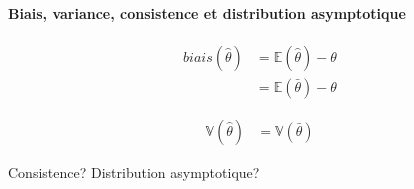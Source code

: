 \paragraph{Biais, variance, consistence et distribution asymptotique}
\begin{align*}
biais(\hat{\theta}) &= \mathbb{E}(\hat{\theta}) - \theta \\
					&= \mathbb{E}(\bar{\theta}) - \theta
\end{align*}

\begin{align*}
\mathbb{V}(\hat{\theta}) 	&= \mathbb{V}(\bar{\theta})
\end{align*}

Consistence?
Distribution asymptotique?


